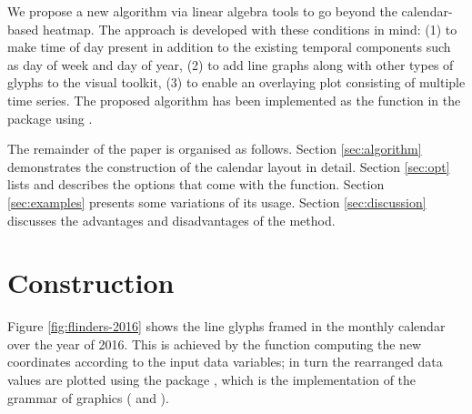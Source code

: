 \documentclass[article]{jss}
\begin{document}
We propose a new algorithm via linear algebra tools to go beyond the
calendar-based heatmap. The approach is developed with these conditions
in mind: (1) to make time of day present in addition to the existing
temporal components such as day of week and day of year, (2) to add line
graphs along with other types of glyphs to the visual toolkit, (3) to
enable an overlaying plot consisting of multiple time series. The
proposed algorithm has been implemented as the 
function in the  package \citep{R-sugrrants} using
 \citep{R-base}.

The remainder of the paper is organised as follows. Section
\ref{sec:algorithm} demonstrates the construction of the calendar layout
in detail. Section \ref{sec:opt} lists and describes the options that
come with the  function. Section \ref{sec:examples}
presents some variations of its usage. Section \ref{sec:discussion}
discusses the advantages and disadvantages of the method.

\section{Construction}\label{construction}

\label{sec:algorithm}

Figure \ref{fig:flinders-2016} shows the line glyphs framed in the
monthly calendar over the year of 2016. This is achieved by the
 function computing the new coordinates according
to the input data variables; in turn the rearranged data values are
plotted using the  package \citep{R-ggplot2}, which is the
implementation of the grammar of graphics (\citet{wilkinson2006grammar}
and \citet{wickham2010layered}).
\end{document}
